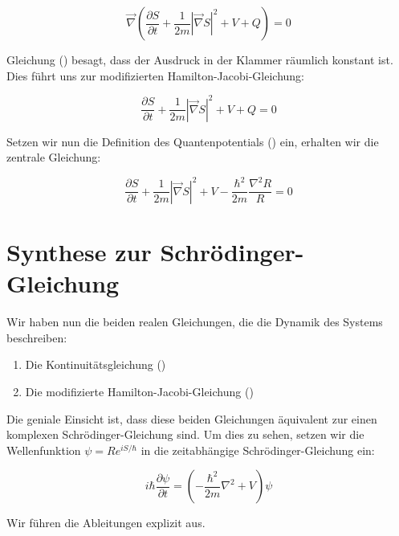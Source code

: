 \begin{equation}
    \label{eq:zwischenstand}
    \vec{\nabla} \left( \frac{\partial S}{\partial t} + \frac{1}{2m} \left| \vec{\nabla} S \right|^2 + V + Q \right) = 0
\end{equation}

Gleichung () besagt, dass der Ausdruck in der Klammer räumlich konstant ist. Dies führt uns zur modifizierten Hamilton-Jacobi-Gleichung:

\begin{equation}
    \frac{\partial S}{\partial t} + \frac{1}{2m} \left| \vec{\nabla} S \right|^2 + V + Q = 0
\end{equation}

Setzen wir nun die Definition des Quantenpotentials () ein, erhalten wir die zentrale Gleichung:

\begin{equation}
    \label{eq:modifizierte_hamilton_jacobi}
    \frac{\partial S}{\partial t} + \frac{1}{2m} \left| \vec{\nabla} S \right|^2 + V - \frac{\hbar^2}{2m} \frac{\nabla^2 R}{R} = 0
\end{equation}

\section{Synthese zur Schrödinger-Gleichung}
\label{sec:schrödinger_gleichung}
Wir haben nun die beiden realen Gleichungen, die die Dynamik des Systems beschreiben:

\begin{enumerate}
    \item Die Kontinuitätsgleichung ()
    \item Die modifizierte Hamilton-Jacobi-Gleichung ()
\end{enumerate}

Die geniale Einsicht ist, dass diese beiden Gleichungen äquivalent zur einen komplexen Schrödinger-Gleichung sind. Um dies zu sehen, setzen wir die Wellenfunktion $\psi = R e^{iS/\hbar}$
in die zeitabhängige Schrödinger-Gleichung ein:

\begin{equation}
    \label{eq:schrödinger_gleichung}
    i\hbar \frac{\partial \psi}{\partial t} = \left( -\frac{\hbar^2}{2m} \nabla^2 + V \right) \psi
\end{equation}

Wir führen die Ableitungen explizit aus.

